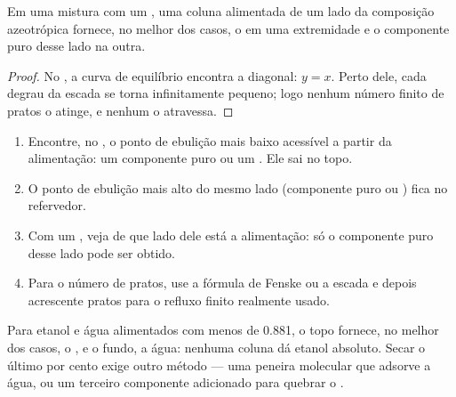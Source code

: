 \begin{proposition}\label{prop:b2:liquid-vapour-diagrams:azeotrope-limit}
Em uma mistura com um , uma coluna alimentada de um lado da
composição azeotrópica fornece, no melhor dos casos, o  em uma
extremidade e o componente puro desse lado na outra.
\end{proposition}

\begin{proof}
No , a curva de equilíbrio encontra a diagonal: $y = x$. Perto dele,
cada degrau da escada se torna infinitamente pequeno; logo nenhum número
finito de pratos o atinge, e nenhum o atravessa.
\end{proof}

\begin{method}\label{met:b2:liquid-vapour-diagrams:predict-distillation}
\begin{enumerate}
  \item Encontre, no , o ponto de ebulição mais baixo
        acessível a partir da alimentação: um componente puro ou um . Ele sai no topo.
  \item O ponto de ebulição mais alto do mesmo lado (componente puro ou
        ) fica no refervedor.
  \item Com um , veja de que lado dele está a alimentação: só o
        componente puro desse lado pode ser obtido.
  \item Para o número de pratos, use a fórmula de Fenske ou a escada e
        depois acrescente pratos para o refluxo finito realmente usado.
\end{enumerate}
\end{method}

Para etanol e água alimentados com menos de 0.881, o topo fornece, no melhor
dos casos, o , e o fundo, a água: nenhuma coluna dá etanol absoluto.
Secar o último por cento exige outro método --- uma peneira molecular que
adsorve a água, ou um terceiro componente adicionado para quebrar o .

